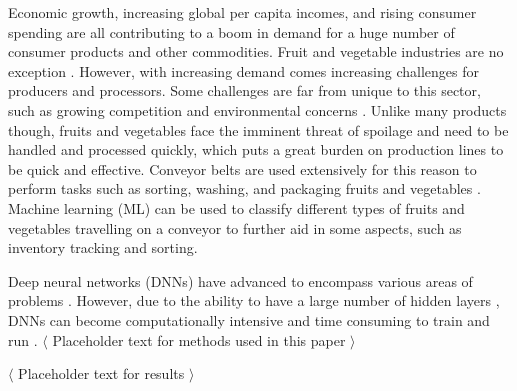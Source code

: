 Economic growth, increasing global per capita incomes, and rising consumer spending are all contributing to a boom in demand for a huge number of consumer products and other commodities. Fruit and vegetable industries are no exception \cite{b1_1}. However, with increasing demand comes increasing challenges for producers and processors. Some challenges are far from unique to this sector, such as growing competition \cite{b1_2} and environmental concerns \cite{b1_3}. Unlike many products though, fruits and vegetables face the imminent threat of spoilage and need to be handled and processed quickly, which puts a great burden on production lines to be quick and effective. Conveyor belts are used extensively for this reason to perform tasks such as sorting, washing, and packaging fruits and vegetables \cite{b1_4}. Machine learning (ML) can be used to classify different types of fruits and vegetables travelling on a conveyor to further aid in some aspects, such as inventory tracking and sorting.

Deep neural networks (DNNs) have advanced to encompass various areas of problems \cite{b1_5,b1_6}. However, due to the ability to have a large number of hidden layers \cite{b1_7}, DNNs can become computationally intensive and time consuming to train and run \cite{b1_8}. $\langle$ Placeholder text for methods used in this paper $\rangle$

$\langle$ Placeholder text for results $\rangle$